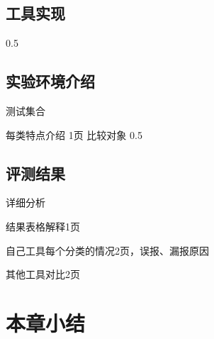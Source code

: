 \subsection{工具实现}
0.5
\subsection{实验环境介绍}
测试集合

每类特点介绍
1页
比较对象
0.5
\subsection{评测结果}
详细分析

结果表格解释1页

自己工具每个分类的情况2页，误报、漏报原因

其他工具对比2页


\section{本章小结}
